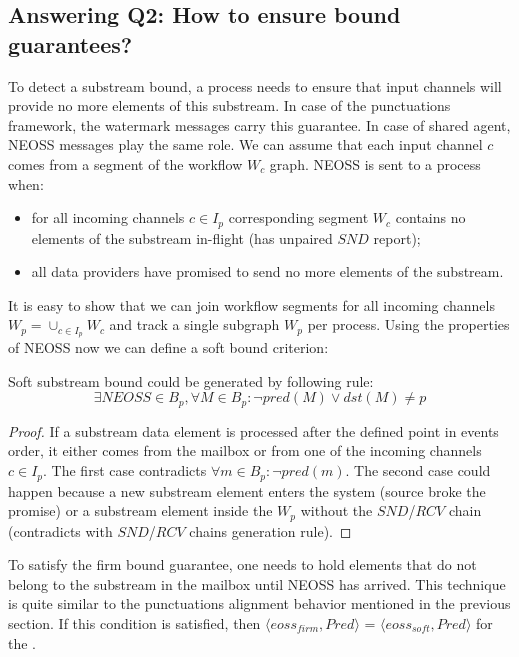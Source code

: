 \subsection{Answering Q2: How to ensure bound guarantees?}
To detect a substream bound, a process needs to ensure that input channels will provide no more elements of this substream. In case of the punctuations framework, the watermark messages carry this guarantee. In case of shared agent, NEOSS messages play the same role. We can assume that each input channel $c$ comes from a segment of the workflow $W_c$ graph. NEOSS is sent to a process when:
\begin{itemize}
    \item for all incoming channels $c \in I_p$ corresponding segment $W_c$ contains no elements of the substream in-flight (has unpaired $SND$ report);
    \item all data providers have promised to send no more elements of the substream.
\end{itemize}
It is easy to show that we can join workflow segments for all incoming channels $W_p = \cup_{c\in I_p} W_c$ and track a single subgraph $W_p$ per process. Using the properties of NEOSS now we can define a soft bound criterion:
\begin{lemma}
Soft substream bound could be generated by following rule:
\begin{equation}
 \exists NEOSS \in B_p, \forall M\in B_p : \neg pred(M) \vee dst(M) \ne p
\end{equation}
\end{lemma}
\begin{proof}
If a substream data element is processed after the defined point in events order, it either comes from the mailbox or from one of the incoming channels $c \in I_p$. The first case contradicts $\forall m\in B_p : \neg pred(m)$. The second case could happen because a new substream element enters the system (source broke the promise) or a substream element inside the $W_p$ without the $SND$/$RCV$ chain (contradicts with $SND$/$RCV$ chains generation rule). 
\end{proof}

To satisfy the firm bound guarantee, one needs to hold elements that do not belong to the substream in the mailbox until NEOSS has arrived. This technique is quite similar to the punctuations alignment behavior mentioned in the previous section. If this condition is satisfied, then $\langle eoss_{firm}, Pred\rangle$ = $\langle eoss_{soft}, Pred\rangle$ for the \tracker.

